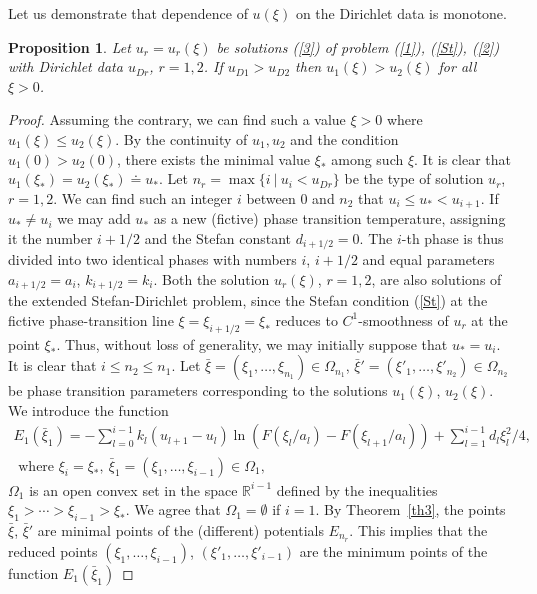 \documentclass[12pt]{article}
\theoremstyle{plain}
\newtheorem{proposition}{Proposition}[section]
\theoremstyle{definition}
\numberwithin{equation}{section}
\newcommand{\R}{{\mathbb R}}
\begin{document}
Let us demonstrate that dependence of $u(\xi)$ on the Dirichlet data is monotone.

\begin{proposition}\label{cor2}
Let $u_r=u_r(\xi)$ be solutions (\ref{3}) of problem (\ref{1}), (\ref{St}), (\ref{2}) with Dirichlet data $u_{Dr}$, $r=1,2$. If $u_{D1}>u_{D2}$ then $u_1(\xi)>u_2(\xi)$ for all $\xi>0$.
\end{proposition}

\begin{proof}

Assuming the contrary, we can find such a value $\xi>0$ where $u_1(\xi)\le u_2(\xi)$. By the continuity of $u_1,u_2$ and the condition $u_1(0)>u_2(0)$, there exists the minimal value $\xi_*$ among such $\xi$.
It is clear that $u_1(\xi_*)=u_2(\xi_*)\doteq u_*$. Let $n_r=\max\{i \ | \ u_i<u_{Dr}\}$ be the type of solution $u_r$, $r=1,2$. We can find such an integer $i$ between $0$ and $n_2$ that $u_i\le u_*<u_{i+1}$. If $u_*\not=u_i$ we may add $u_*$ as a new (fictive) phase transition temperature, assigning it  the number $i+1/2$ and the Stefan constant $d_{i+1/2}=0$. The $i$-th phase is thus divided into two identical phases with numbers $i$, $i+1/2$ and equal parameters $a_{i+1/2}=a_i$, $k_{i+1/2}=k_i$. Both the solution $u_r(\xi)$, $r=1,2$, are also solutions of the extended Stefan-Dirichlet problem, since the Stefan condition (\ref{St}) at the fictive phase-transition line $\xi=\xi_{i+1/2}=\xi_*$ reduces to $C^1$-smoothness of $u_r$ at the point $\xi_*$.
Thus, without loss of generality, we may initially suppose that $u_*=u_i$. It is clear that $i\le n_2\le n_1$. Let $\bar\xi=(\xi_1,\ldots,\xi_{n_1})\in\Omega_{n_1}$, $\bar\xi'=(\xi'_1,\ldots,\xi'_{n_2})\in\Omega_{n_2}$ be phase transition parameters corresponding to the solutions $u_1(\xi)$, $u_2(\xi)$.
 We introduce the function
\begin{align*} E_1(\bar\xi_1)=-\sum_{l=0}^{i-1} k_l(u_{l+1}-u_l)\ln (F(\xi_l/a_l)-F(\xi_{l+1}/a_l))+\sum_{l=1}^{i-1} d_l\xi_l^2/4, \\
\mbox{ where } \xi_i=\xi_*, \ \bar\xi_1=(\xi_1,\ldots,\xi_{i-1})\in\Omega_1,
\end{align*}
$\Omega_1$ is an open convex set in the space $\R^{i-1}$ defined by the inequalities $\xi_1>\cdots >\xi_{i-1}>\xi_*$. We agree that $\Omega_1=\emptyset$ if $i=1$. By Theorem~\ref{th3}, the points $\bar\xi$, $\bar\xi'$ are minimal points of the (different) potentials $E_{n_r}$. This implies that the reduced points
$(\xi_1,\ldots,\xi_{i-1})$, $(\xi'_1,\ldots,\xi'_{i-1})$ are the minimum points of the function $E_1(\bar\xi_1)$

\end{proof}
\end{document}
